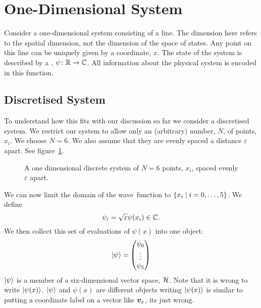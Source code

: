     \section{One-Dimensional System}
    Consider a one-dimensional system consisting of a line.
    The dimension here refers to the spatial dimension, not the dimension of the space of states.
    Any point on this line can be uniquely given by a coordinate, \(x\).
    The state of the system is described by a , \(\psi\colon\mathbb{R}\to\mathbb{C}\).
    All information about the physical system is encoded in this function.
    
    \subsection{Discretised System}
    To understand how this fits with our discussion so far we consider a discretised system.
    We restrict our system to allow only an (arbitrary) number, \(N\), of points, \(x_i\).
    We choose \(N = 6\).
    We also assume that they are evenly spaced a distance \(\varepsilon\) apart.
    See figure~\ref{fig:one dimensional discrete system}.
    \begin{figure}[ht]
        \centering
        \caption{A one dimensional discrete system of \(N = 6\) points, \(x_i\), spaced evenly \(\varepsilon\) apart.}
        \label{fig:one dimensional discrete system}
    \end{figure}
    We can now limit the domain of the wave~function to \(\{x_i\mid i=0,\dotsc, 5\}\).
    We define
    \[\psi_i = \sqrt{\varepsilon}\psi(x_i) \in\mathbb{C}.\]
    We then collect this set of evaluations of \(\psi(x)\) into one object:
    \[
        \vert {\psi} \rangle =
        \begin{pmatrix}
            \psi_0\\ \vdots\\ \psi_5
        \end{pmatrix}
    \]
    \(\vert {\psi} \rangle\) is a member of a six-dimensional vector space, \(\mathcal{H}\).
    Note that it is wrong to write \(\vert {\psi(x)} \rangle\).
    \(\vert {\psi} \rangle\) and \(\psi(x)\) are different objects writing \(\vert {\psi(x)} \rangle\) is similar to putting a coordinate label on a vector like \(\bm{v}_x\), its just wrong.
    
